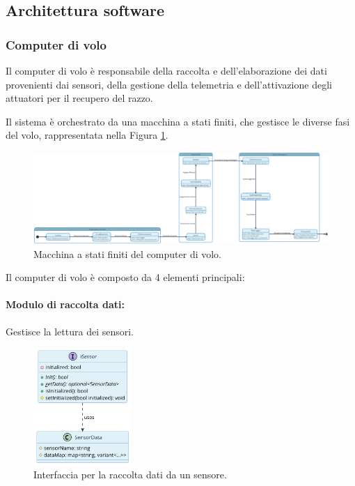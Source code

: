 \documentclass[12pt,a4paper,twoside]{book}
\begin{document}
\subsection{Architettura software}

\subsubsection{Computer di volo}
Il computer di volo è responsabile della raccolta e dell'elaborazione dei dati
provenienti dai sensori, della gestione della telemetria e dell'attivazione degli
attuatori per il recupero del razzo.

Il sistema è orchestrato da una macchina a stati finiti, che gestisce le diverse
fasi del volo, rappresentata nella Figura \ref{fig:flight-computer-fsm}.
\ifdefined\HCode
\else
    \begin{landscape}
        \fi
        \begin{figure}[H]
            \centering
            \vspace*{2cm}  %
            \hspace*{-4cm}
            \includegraphics[width=1.7\textwidth]{img/uml/fsm.png}
            \caption{Macchina a stati finiti del computer di volo.}
            \label{fig:flight-computer-fsm}
            \vspace*{-1cm}  %
        \end{figure}
        \thispagestyle{empty}  %
        \ifdefined\HCode
        \else
    \end{landscape}
\fi

\newpage
Il computer di volo è composto da 4 elementi principali:
\paragraph{\textbf{Modulo di raccolta dati:}} Gestisce la lettura dei sensori.
\begin{figure}[H]
    \centering
    \includegraphics[width=0.33\textwidth]{img/uml/sensor.png}
    \caption{Interfaccia per la raccolta dati da un sensore.}
    \label{fig:flight-computer-data-collection}
\end{figure}
\end{document}
